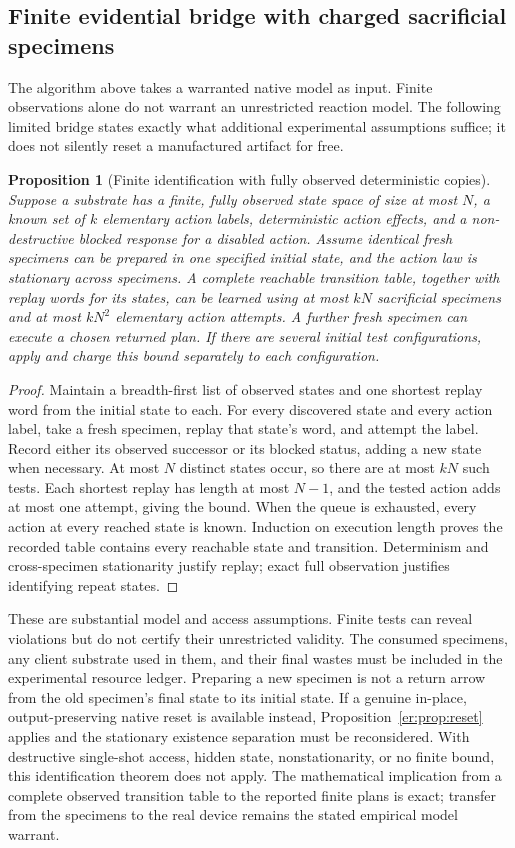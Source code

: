 \documentclass[11pt]{article}
\newtheorem{proposition}[theorem]{Proposition}
\theoremstyle{definition}
\theoremstyle{remark}
\begin{document}
\subsection{Finite evidential bridge with charged sacrificial specimens}
The algorithm above takes a warranted native model as input. Finite observations alone do not warrant an unrestricted reaction model. The following limited bridge states exactly what additional experimental assumptions suffice; it does not silently reset a manufactured artifact for free.

\begin{proposition}[Finite identification with fully observed deterministic copies]\label{er:prop:identify}
Suppose a substrate has a finite, fully observed state space of size at most $N$, a known set of $k$ elementary action labels, deterministic action effects, and a non-destructive blocked response for a disabled action. Assume identical fresh specimens can be prepared in one specified initial state, and the action law is stationary across specimens. A complete reachable transition table, together with replay words for its states, can be learned using at most $kN$ sacrificial specimens and at most $kN^2$ elementary action attempts. A further fresh specimen can execute a chosen returned plan. If there are several initial test configurations, apply and charge this bound separately to each configuration.
\end{proposition}
\begin{proof}
Maintain a breadth-first list of observed states and one shortest replay word from the initial state to each. For every discovered state and every action label, take a fresh specimen, replay that state's word, and attempt the label. Record either its observed successor or its blocked status, adding a new state when necessary. At most $N$ distinct states occur, so there are at most $kN$ such tests. Each shortest replay has length at most $N-1$, and the tested action adds at most one attempt, giving the bound. When the queue is exhausted, every action at every reached state is known. Induction on execution length proves the recorded table contains every reachable state and transition. Determinism and cross-specimen stationarity justify replay; exact full observation justifies identifying repeat states.
\end{proof}

These are substantial model and access assumptions. Finite tests can reveal violations but do not certify their unrestricted validity. The consumed specimens, any client substrate used in them, and their final wastes must be included in the experimental resource ledger. Preparing a new specimen is not a return arrow from the old specimen's final state to its initial state. If a genuine in-place, output-preserving native reset is available instead, Proposition~\ref{er:prop:reset} applies and the stationary existence separation must be reconsidered. With destructive single-shot access, hidden state, nonstationarity, or no finite bound, this identification theorem does not apply. The mathematical implication from a complete observed transition table to the reported finite plans is exact; transfer from the specimens to the real device remains the stated empirical model warrant.
\end{document}
